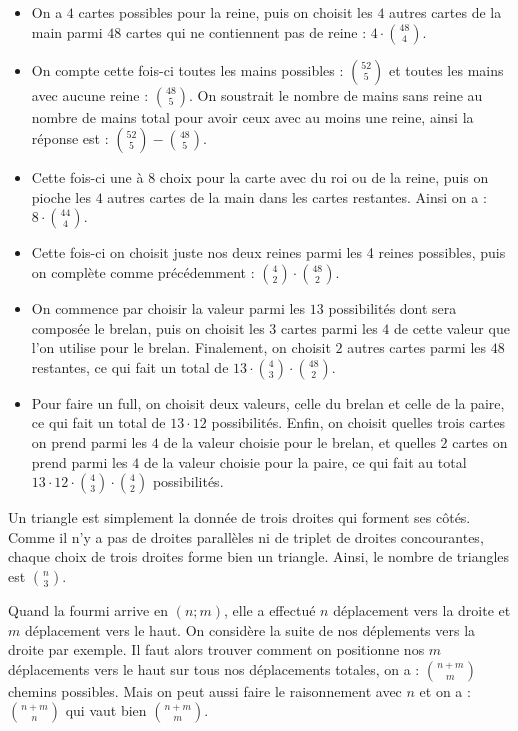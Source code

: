 \begin{sol}
\begin{itemize}
\item On a $4$ cartes possibles pour la reine, puis on choisit les $4$ autres cartes de la main parmi $48$ cartes qui ne contiennent pas de reine : $4 \cdot \binom{48}{4}$.
\item On compte cette fois-ci toutes les mains possibles : $\binom{52}{5}$ et toutes les mains avec aucune reine : $\binom{48}{5}$. On soustrait le nombre de mains sans reine au nombre de mains total pour avoir ceux avec au moins une reine, ainsi la réponse est : $\binom{52}{5} - \binom{48}{5}$.
\item Cette fois-ci une à $8$ choix pour la carte avec du roi ou de la reine, puis on pioche les $4$ autres cartes de la main dans les cartes restantes. Ainsi on a : $8 \cdot \binom{44}{4}$.
\item Cette fois-ci on choisit juste nos deux reines parmi les 4 reines possibles, puis on complète comme précédemment : $\binom{4}{2} \cdot \binom{48}{2}$.
\item On commence par choisir la valeur parmi les $13$ possibilités dont sera composée le brelan, puis on choisit les $3$ cartes parmi les $4$ de cette valeur que l'on utilise pour le brelan. Finalement, on choisit $2$ autres cartes parmi les $48$ restantes, ce qui fait un total de $13\cdot \binom43\cdot\binom{48}2$.
\item Pour faire un full, on choisit deux valeurs, celle du brelan et celle de la paire, ce qui fait un total de $13\cdot 12$ possibilités. Enfin, on choisit quelles trois cartes on prend parmi les $4$ de la valeur choisie pour le brelan, et quelles $2$ cartes on prend parmi les $4$ de la valeur choisie pour la paire, ce qui fait au total $13\cdot 12\cdot \binom 43\cdot\binom 42$ possibilités.

\end{itemize}
\end{sol}

\begin{sol}
Un triangle est simplement la donnée de trois droites qui forment ses côtés. Comme il n'y a pas de droites parallèles ni de triplet de droites concourantes, chaque choix de trois droites forme bien un triangle. Ainsi, le nombre de triangles est $\binom n3$.
\end{sol}

\begin{sol}
Quand la fourmi arrive en $(n;m)$, elle a effectué $n$ déplacement vers la droite et $m$ déplacement vers le haut. On considère la suite de nos déplements vers la droite par exemple. Il faut alors trouver comment on positionne nos $m$ déplacements vers le haut sur tous nos déplacements totales, on a : $\binom{n+m}{m}$ chemins possibles.
Mais on peut aussi faire le raisonnement avec $n$ et on a : $\binom{n+m}{n} $ qui vaut bien $\binom{n+m}{m}$.
\end{sol}


